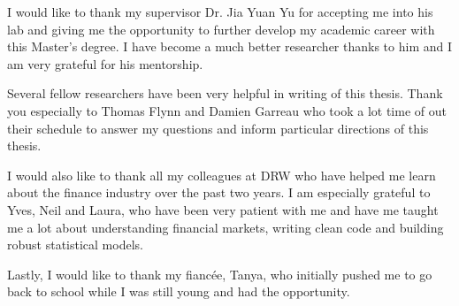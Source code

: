 \begin{acknowledgments}
  
  I would like to thank my supervisor Dr. Jia Yuan Yu for accepting me into his lab and giving me the opportunity to further develop my academic career with this Master's degree. I have become a much better researcher thanks to him and I am very grateful for his mentorship.
  
 Several fellow researchers have been very helpful in writing of this thesis. Thank you especially to Thomas Flynn and Damien Garreau who took a lot time of out their schedule to answer my questions and inform particular directions of this thesis.
  
  I would also like to thank all my colleagues at DRW who have helped me learn about the finance industry over the past two years. I am especially grateful to Yves, Neil and Laura, who have been very patient with me and have me taught me a lot about understanding financial markets, writing clean code and building robust statistical models.
  
  Lastly, I would like to thank my fiancée, Tanya, who initially pushed me to go back to school while I was still young and had the opportunity. 
\end{acknowledgments}
